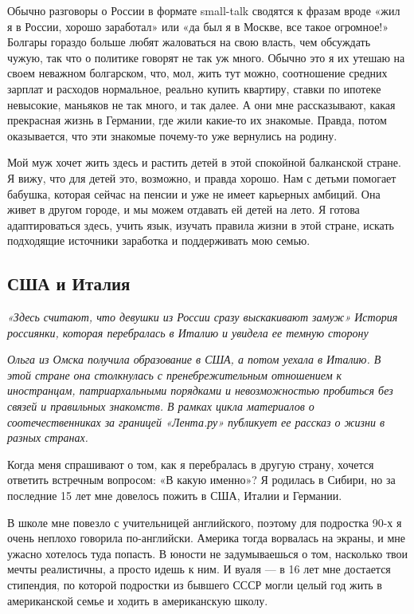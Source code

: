 Обычно разговоры о России в формате small-talk сводятся к фразам вроде «жил я в России, хорошо заработал» или «да был я в Москве, все такое огромное!» Болгары гораздо больше любят жаловаться на свою власть, чем обсуждать чужую, так что о политике говорят не так уж много. Обычно это я их утешаю на своем неважном болгарском, что, мол, жить тут можно, соотношение средних зарплат и расходов нормальное, реально купить квартиру, ставки по ипотеке невысокие, маньяков не так много, и так далее. А они мне рассказывают, какая прекрасная жизнь в Германии, где жили какие-то их знакомые. Правда, потом оказывается, что эти знакомые почему-то уже вернулись на родину.

Мой муж хочет жить здесь и растить детей в этой спокойной балканской стране. Я вижу, что для детей это, возможно, и правда хорошо. Нам с детьми помогает бабушка, которая сейчас на пенсии и уже не имеет карьерных амбиций. Она живет в другом городе, и мы можем отдавать ей детей на лето. Я готова адаптироваться здесь, учить язык, изучать правила жизни в этой стране, искать подходящие источники заработка и поддерживать мою семью.

\newpage
\subsection{США и Италия}
\textit{«Здесь считают, что девушки из России сразу выскакивают замуж» История россиянки, которая перебралась в Италию и увидела ее темную сторону}

\textit{Ольга из Омска получила образование в США, а потом уехала в Италию. В этой стране она столкнулась с пренебрежительным отношением к иностранцам, патриархальными порядками и невозможностью пробиться без связей и правильных знакомств. В рамках цикла материалов о соотечественниках за границей «Лента.ру» публикует ее рассказ о жизни в разных странах.}

Когда меня спрашивают о том, как я перебралась в другую страну, хочется ответить встречным вопросом: «В какую именно»? Я родилась в Сибири, но за последние 15 лет мне довелось пожить в США, Италии и Германии.

В школе мне повезло с учительницей английского, поэтому для подростка 90-х я очень неплохо говорила по-английски. Америка тогда ворвалась на экраны, и мне ужасно хотелось туда попасть. В юности не задумываешься о том, насколько твои мечты реалистичны, а просто идешь к ним. И вуаля — в 16 лет мне достается стипендия, по которой подростки из бывшего СССР могли целый год жить в американской семье и ходить в американскую школу.


